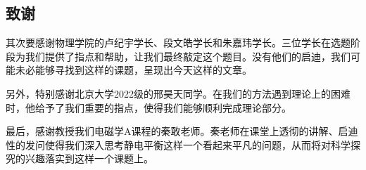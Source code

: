 \documentclass[UTF8]{article}
\numberwithin{figure}{subsection}
\numberwithin{table}{subsection}
\begin{document}
\begin{multicols}{2}
    \section{致谢}
    \par 其次要感谢物理学院的卢纪宇学长、段文皓学长和朱嘉玮学长。三位学长在选题阶段为我们提供了指点和帮助，让我们最终敲定这个题目。没有他们的启迪，我们可能未必能够寻找到这样的课题，呈现出今天这样的文章。
    \par 另外，特别感谢北京大学2022级的邢昊天同学。在我们的方法遇到理论上的困难时，他给予了我们重要的指点，使得我们能够顺利完成理论部分。
    \par 最后，感谢教授我们电磁学A课程的秦敢老师。秦老师在课堂上透彻的讲解、启迪性的发问使得我们深入思考静电平衡这样一个看起来平凡的问题，从而将对科学探究的兴趣落实到这样一个课题上。
    
\end{multicols}
\renewcommand\refname{参考文献}


\end{document}
